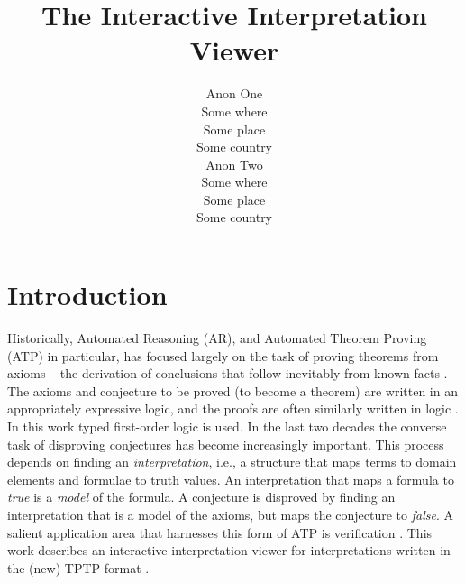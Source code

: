 \documentclass[letterpaper]{article}
\begin{document}
\title{The Interactive Interpretation Viewer}
\author{Anon One\\
Some where\\
Some place\\
Some country\\
\And
Anon Two\\
Some where\\
Some place\\
Some country}

\maketitle
\section{Introduction}
\label{Introduction}

Historically, Automated Reasoning (AR), and Automated Theorem Proving (ATP) in particular, has 
focused largely on the task of proving theorems from axioms -- the derivation of conclusions that 
follow inevitably from known facts \cite{RV01-HAR}.
The axioms and conjecture to be proved (to become a theorem) are written in an 
appropriately expressive logic, and the proofs are often similarly written in logic \cite{SS+06}.
In this work typed first-order logic is used.
In the last two decades the converse task of disproving conjectures
has become increasingly important.
This process depends on finding an {\em interpretation}, i.e., a structure that maps terms 
to domain elements and formulae to truth values.
An interpretation that maps a formula to {\em true} is a {\em model} of the formula.
A conjecture is disproved by finding an interpretation that is a model of the axioms, but 
maps the conjecture to {\em false}.
A salient application area that harnesses this form of ATP is verification \cite{DKW08}.
This work describes an interactive interpretation viewer for interpretations written in the
(new) TPTP format \cite{SS+22-FLAIRS}.
\end{document}
